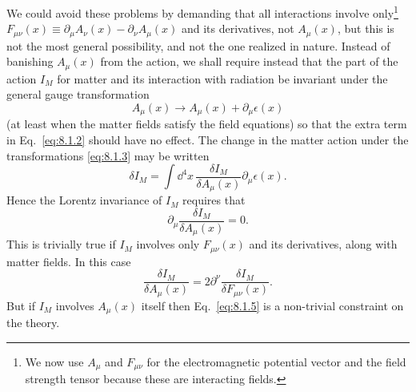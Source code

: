 We could avoid these problems by demanding that all interactions
involve only\footnote{We now use $A_\mu$ and $F_{\mu\nu}$ for the electromagnetic
potential vector and the field strength tensor because these are interacting
fields.} $F_{\mu\nu}(x)\equiv\partial_\mu A_\nu(x)-\partial_\nu A_\mu(x)$ and its
derivatives, not $A_\mu(x)$, but this is not the most general possibility, and
not the one realized in nature. Instead of banishing $A_\mu(x)$ from the
action, we shall require instead that the part of the action $I_M$ for matter
and its interaction with radiation be invariant under the general gauge
transformation
\begin{equation}
  A_\mu(x)\longrightarrow A_\mu(x)+\partial_\mu\epsilon(x)
  \tag{8.1.3}\label{eq:8.1.3}
\end{equation}
(at least when the matter fields satisfy the field equations) so that the extra
term in Eq.~\eqref{eq:8.1.2} should have no effect. The change in the matter action
under the transformations \eqref{eq:8.1.3} may be written
\begin{equation}
  \delta I_M=\int \dd^4x\,\frac{\delta I_M}{\delta A_\mu(x)}
  \partial_\mu\epsilon(x).
  \tag{8.1.4}\label{eq:8.1.4}
\end{equation}
Hence the Lorentz invariance of $I_M$ requires that
\begin{equation}
  \partial_\mu\frac{\delta I_M}{\delta A_\mu(x)}=0.
  \tag{8.1.5}\label{eq:8.1.5}
\end{equation}
This is trivially true if $I_M$ involves only $F_{\mu\nu}(x)$ and its derivatives,
along with matter fields. In this case
\[
  \frac{\delta I_M}{\delta A_\mu(x)}
  =2\partial^\nu\frac{\delta I_M}{\delta F_{\mu\nu}(x)}.
\]
But if $I_M$ involves $A_\mu(x)$ itself then Eq.~\eqref{eq:8.1.5} is a non-trivial
constraint on the theory.

